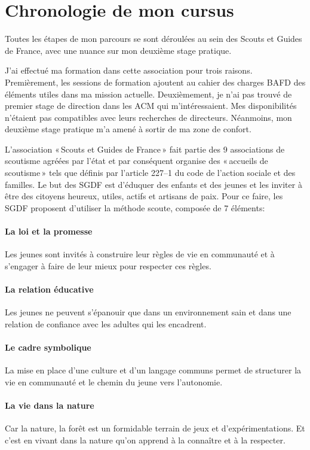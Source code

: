 \documentclass[titlepage,11pt,a4paper]{article}
\begin{document}
\section{Chronologie de mon cursus}

Toutes les étapes de mon parcours se sont déroulées au sein des Scouts et Guides de
France, avec une nuance sur mon deuxième stage pratique.

J'ai effectué ma formation dans cette association pour trois raisons. Premièrement,
les sessions de formation ajoutent au cahier des charges BAFD des éléments utiles dans ma
mission actuelle. Deuxièmement, je n'ai pas trouvé de premier stage de direction dans les ACM qui
m'intéressaient. Mes disponibilités n'étaient pas compatibles avec leurs recherches de
directeurs. Néanmoins, mon deuxième stage pratique m'a amené à sortir de ma zone de confort.

L'association «\,Scouts et Guides de France\,» fait partie des 9 associations de scoutisme agréées par
l'état et par conséquent organise des «\,accueils de scoutisme\,» tels que définis par
l'article 227--1 du code de l'action sociale et des familles. Le but des SGDF est d'éduquer
des enfants et des jeunes et les inviter à être des citoyens heureux, utiles, actifs et artisans
de paix. Pour ce faire, les SGDF proposent d'utiliser la méthode scoute, composée de 7
éléments:\label{methsc}

\paragraph{La loi et la promesse} Les jeunes sont invités à construire leur règles de vie
en communauté et à s'engager à faire de leur mieux pour respecter ces règles.

\paragraph{La relation éducative} Les jeunes ne peuvent s'épanouir que dans un
environnement sain et dans une relation de confiance avec les adultes qui les encadrent.

\paragraph{Le cadre symbolique} La mise en place d'une culture et d'un langage communs
permet de structurer la vie en communauté et le chemin du jeune vers l'autonomie.

\paragraph{La vie dans la nature} Car la nature, la forêt est un formidable terrain de jeux
et d'expérimentations. Et c'est en vivant dans la nature qu'on apprend à la connaître et à
la respecter.
\end{document}

